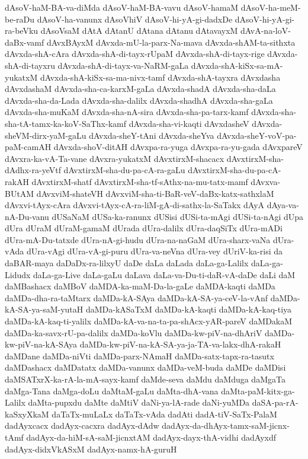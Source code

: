 {dAsoV-haM-BA-va-diMda
dAsoV-haM-BA-vavu
dAsoV-hamaM
dAsoV-ha-meM-be-raDu
dAsoV-ha-vanunx
dAsoVhiV
dAsoV-hi-yA-gi-dadxDe
dAsoV-hi-yA-gi-ra-beVku
dAsoVsaM
dAtA
dAtanU
dAtana
dAtanu
dAtavayxM
dAvA-na-loV-daBx-vamf
dAvxBAyxM
dAvxda-mU-la-parx-Na-mava
dAvxda-shAM-ta-sithxta
dAvxda-shA-cAra
dAvxda-shA-di-tayx-rUpaM
dAvxda-shA-di-tayx-rige
dAvxda-shA-di-tayxru
dAvxda-shA-di-tayx-va-NaRM-gaLa
dAvxda-shA-kiSx-sa-mA-yukatxM
dAvxda-shA-kiSx-sa-ma-nivx-tamf
dAvxda-shA-tayxra
dAvxdasha
dAvxdashaM
dAvxda-sha-ca-karxM-gaLa
dAvxda-shadA
dAvxda-sha-daLa
dAvxda-sha-da-Lada
dAvxda-sha-dalilx
dAvxda-shadhA
dAvxda-sha-gaLa
dAvxda-sha-muKaM
dAvxda-sha-nA-sira
dAvxda-sha-pa-tarx-kamf
dAvxda-sha-sha-tA-tamx-ka-koV-SaThx-kamf
dAvxda-sha-vi-kaqti
dAvxdasheV
dAvxda-sheVM-dirx-yaM-gaLu
dAvxda-sheY-tAni
dAvxda-sheYva
dAvxda-sheY-voV-pa-paM-camAH
dAvxda-shoV-ditAH
dAvxpa-ra-yuga
dAvxpa-ra-yu-gada
dAvxpareV
dAvxra-ka-vA-Ta-vane
dAvxra-yukatxM
dAvxtirxM-shacacx
dAvxtirxM-sha-dAdhx-ra-yeVtf
dAvxtirxM-sha-du-pa-cA-ra-gaLu
dAvxtirxM-sha-du-pa-cA-rakAH
dAvxtirxM-shatf
dAvxtirxM-sha-tf-sAthx-na-mu-tatx-mamf
dAvxva-BUtAM
dAvxviM-shateVH
dAvxviM-sha-ti-BaR-veV-daBx-katx-sathxlaM
dAvxvi-tAyx-cAra
dAvxvi-tAyx-cA-ra-liM-gA-di-sathx-la-SaTakx
dAyA
dAya-va-nA-Du-vanu
dUSaNaM
dUSa-ka-ranunx
dUSisi
dUSi-ta-mAgi
dUSi-ta-nAgi
dUpa
dUra
dUraM
dUraM-gamaM
dUrada
dUra-dalilx
dUra-daqSiTx
dUra-mADi
dUra-mA-Du-tatxde
dUra-nA-gi-hudu
dUra-na-naGaM
dUra-sharx-vaNa
dUra-vAda
dUra-vAgi
dUra-vA-gi-puru
dUra-va-neVna
dUra-vey
dUriV-ka-risi
da
daBAR-maya
daDaDx-ra-lilxyU
daDe
daLa
daLada
daLa-ga-Lalilx
daLa-ga-Lidudx
daLa-ga-Live
daLa-gaLu
daLava
daLa-va-Du-ti-daR-vA-daDe
daLi
daM
daMBashacx
daMBoV
daMDA-ka-maM-Da-la-gaLe
daMDA-kaqti
daMDa
daMDa-dha-ra-taMtarx
daMDa-kA-SAya
daMDa-kA-SA-ya-ceV-la-vAnf
daMDa-kA-SA-ya-saM-yutaH
daMDa-kASaTxM
daMDa-kA-kaqti
daMDa-kA-kaq-tiya
daMDa-kA-kaq-ti-yalilx
daMDa-kA-va-na-ta-pa-shAcx-yAR-pareV
daMDakaM
daMDa-ka-savx-rU-pa-dalilx
daMDa-koVlu
daMDa-kw-piV-na-dhAriV
daMDa-kw-piV-na-kA-SAya
daMDa-kw-piV-na-kA-SA-ya-ja-TA-va-lakx-dhA-rakaH
daMDane
daMDa-niVti
daMDa-parx-NAmaH
daMDa-satx-tapx-ra-tasutx
daMDashacx
daMDatatx
daMDa-vanunx
daMDa-veM-buda
daMDe
daMDisi
daMSATxrX-ka-rA-la-mA-sayx-kamf
daMde-seva
daMdu
daMduga
daMgaTa
daMga-Tana
daMga-doLu
daMtaM-gaLu
daMta-dhA-vana
daMta-paM-kitx-ga-Lalilx
daMta-pupxdu
daMte
daMtiV
daNi-ya-lA-rade
daNi-yuMDa
daSA-pa-rA-kaSxyXkaM
daTaTx-muLaLx
daTaTx-vAda
dadAti
dadA-tiV-SaTx-PalaM
dadAyxcacx
dadAyx-cacxra
dadAyx-dAdw
dadAyx-da-dhAyx-tamx-saM-jicnx-tAmf
dadAyx-da-hiM-sA-saM-jicnxtAM
dadAyx-dayx-thA-vidhi
dadAyxdf
dadAyx-didxVkASxM
dadAyx-namx-hA-guruH
}
